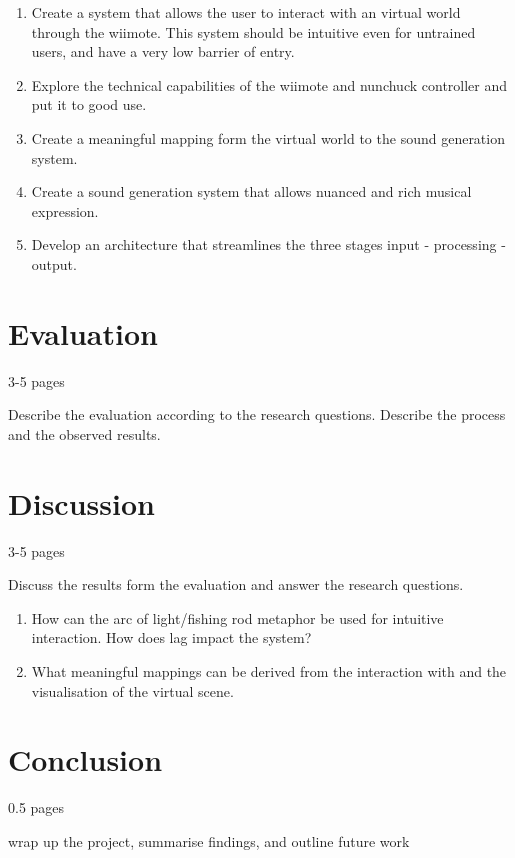 \documentclass[10pt,a4paper]{scrartcl}
\begin{document}
\begin{enumerate}
\item Create a system that allows the user to interact with an virtual world through the wiimote. This system should be intuitive even for untrained users, and have a very low barrier of entry.

\item Explore the technical capabilities of the wiimote and nunchuck controller and put it to good use.

\item Create a meaningful mapping form the virtual world to the sound generation system.

\item Create a sound generation system that allows nuanced and rich musical expression.
\item  Develop an architecture that streamlines the three stages input - processing - output.
\end{enumerate}

\section{Evaluation}
3-5 pages

Describe the evaluation according to the research questions. Describe the process and the observed results.


\section{Discussion}
3-5 pages

Discuss the results form the evaluation and answer the research questions. 

\begin{enumerate}
\item How can the arc of light/fishing rod metaphor be used for intuitive interaction. How does lag impact the system?
\item What meaningful mappings can be derived from the interaction with and the visualisation of the virtual scene.
\end{enumerate}

\section{Conclusion}
0.5 pages

wrap up the project, summarise findings, and outline future work






\end{document}
